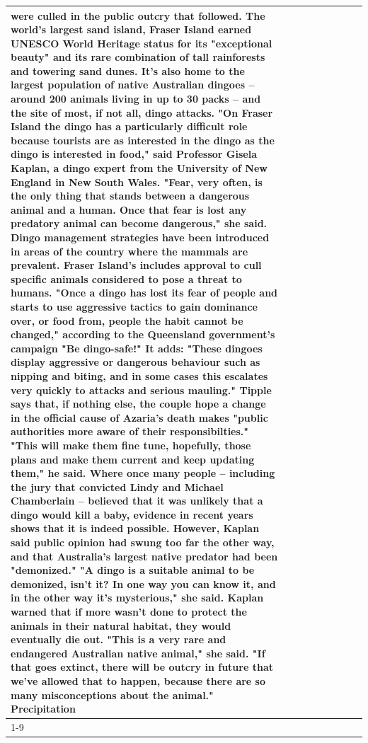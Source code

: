 \begin{table}[H]
\begin{tabular}{lllrlllll}
were culled in the public outcry that followed. The world's largest sand island, Fraser Island earned UNESCO World Heritage status for its "exceptional beauty" and its rare combination of tall rainforests and towering sand dunes. It's also home to the largest population of native Australian dingoes -- around 200 animals living in up to 30 packs -- and the site of most, if not all, dingo attacks. "On Fraser Island the dingo has a particularly difficult role because tourists are as interested in the dingo as the dingo is interested in food," said Professor Gisela Kaplan, a dingo expert from the University of New England in New South Wales. "Fear, very often, is the only thing that stands between a dangerous animal and a human. Once that fear is lost any predatory animal can become dangerous," she said. Dingo management strategies have been introduced in areas of the country where the mammals are prevalent. Fraser Island's includes approval to cull specific animals considered to pose a threat to humans. "Once a dingo has lost its fear of people and starts to use aggressive tactics to gain dominance over, or food from, people the habit cannot be changed," according to the Queensland government's campaign "Be dingo-safe!" It adds: "These dingoes display aggressive or dangerous behaviour such as nipping and biting, and in some cases this escalates very quickly to attacks and serious mauling." Tipple says that, if nothing else, the couple hope a change in the official cause of Azaria's death makes "public authorities more aware of their responsibilties." "This will make them fine tune, hopefully, those plans and make them current and keep updating them," he said. Where once many people -- including the jury that convicted Lindy and Michael Chamberlain -- believed that it was unlikely that a dingo would kill a baby, evidence in recent years shows that it is indeed possible. However, Kaplan said public opinion had swung too far the other way, and that Australia's largest native predator had been "demonized." "A dingo is a suitable animal to be demonized, isn't it? In one way you can know it, and in the other way it's mysterious," she said. Kaplan warned that if more wasn't done to protect the animals in their natural habitat, they would eventually die out. "This is a very rare and endangered Australian native animal," she said. "If that goes extinct, there will be outcry in future that we've allowed that to happen, because there are so many misconceptions about the animal." Precipitation \\
\cline{1-9}

\end{tabular}
\end{table}
